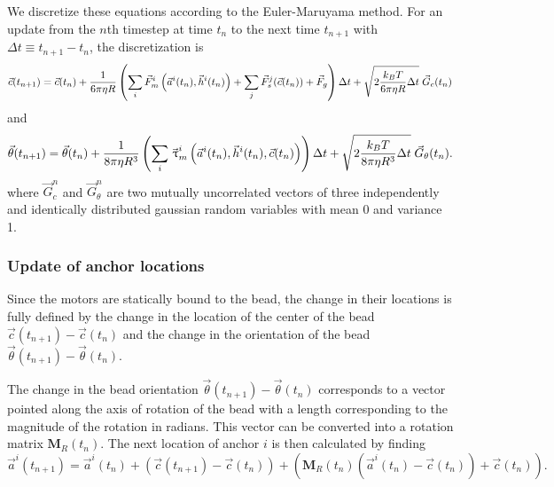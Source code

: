 We discretize these equations according to the Euler-Maruyama method. For an update from the $n$th timestep at time $t_n$ to the next time $t_{n+1}$ with $\Delta t \equiv t_{n+1}-t_n$, the discretization is
\begin{equation} \label{eq:cSDE_discretized}
\vec{c}(t_{n+1}) = \vec{c}(t_n) +
\frac{1}{6 \pi \eta R} \left( \sum_i \vec{F}_m^i \left( \vec{a}^i(t_n) ,\vec{h}^i(t_n) \right) + \sum_j \vec{F}_s^j(\vec{c}(t_n)) + \vec{F}_g \right) \Delta t + \\
\sqrt{2 \frac{k_B T}{6 \pi \eta R} \Delta t} \;\vec{G}_c(t_n)
\end{equation}
and
\begin{equation} \label{eq:thetaSDE_discretized}
\vec{\theta}(t_{n+1})= \vec{\theta}(t_n) +
\frac{1}{8 \pi \eta R^3} \left( \sum_i \vec{\tau}_m^i \left( \vec{a}^i(t_n) ,\vec{h}^i(t_n) , \vec{c}(t_n) \right) \right) \Delta t + \\
\sqrt{2 \frac{k_B T}{8 \pi \eta R^3} \Delta t} \;\vec{G}_\theta(t_n).
\end{equation}
where $\vec{G}_c^n$ and $\vec{G}_\theta^n$ are two mutually uncorrelated vectors of three independently and identically distributed gaussian random variables with mean \num{0} and variance \num{1}.

\subsubsection*{Update of anchor locations}

Since the motors are statically bound to the bead, the change in their locations is fully defined by the change in the location of the center of the bead $\vec{c}(t_{n+1})-\vec{c}(t_n)$ and the change in the orientation of the bead $\vec{\theta}(t_{n+1}) - \vec{\theta}(t_n)$.

The change in the bead orientation $\vec{\theta}(t_{n+1}) - \vec{\theta}(t_n)$ corresponds to a vector pointed along the axis of rotation of the bead with a length corresponding to the magnitude of the rotation in radians. This vector can be converted into a rotation matrix $\mathbf{M}_R(t_n)$. The next location of anchor $i$ is then calculated by finding
\begin{equation} \label{eq:anchor_update}
\vec{a}^i(t_{n+1})=\vec{a}^i(t_n) + \left( \vec{c}(t_{n+1})-\vec{c}(t_n) \right) + 
\left( \mathbf{M}_R(t_n) \left( \vec{a}^i(t_n) - \vec{c}(t_n) \right) + \vec{c}(t_n) \right).
\end{equation}

